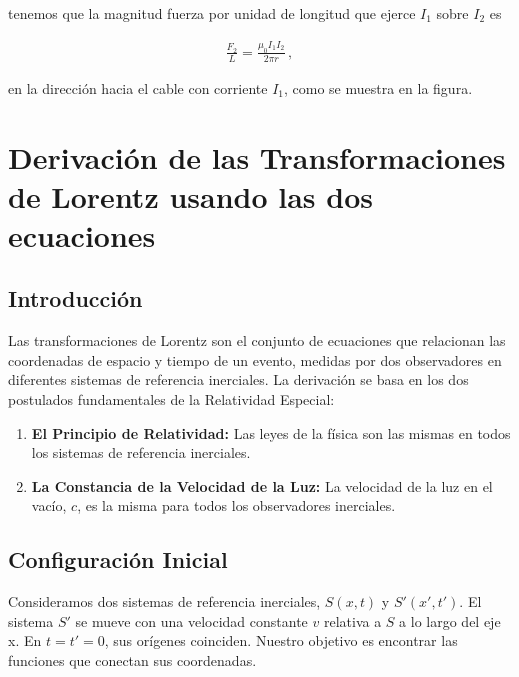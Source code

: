 \documentclass[11pt,a4paper]{article}
\begin{document}
\begin{minipage}{\mipa}
tenemos que la magnitud fuerza por unidad de longitud que ejerce $I_1$ sobre $I_2$ es
\end{minipage}

\begin{align*}
    \frac{F_2}{L} = \frac{\mu_0 I_1 I_2}{2\pi r}\,,
\end{align*}

\begin{minipage}{\mipa}
en la dirección hacia el cable con corriente $I_1$, como se muestra en la figura.
\end{minipage}



\section*{Derivación de las Transformaciones de Lorentz usando las dos ecuaciones}

\subsection*{Introducción}

Las transformaciones de Lorentz son el conjunto de ecuaciones que relacionan las coordenadas de espacio y tiempo de un evento, medidas por dos observadores en diferentes sistemas de referencia inerciales. La derivación se basa en los dos postulados fundamentales de la Relatividad Especial:
\begin{enumerate}
    \item \textbf{El Principio de Relatividad:} Las leyes de la física son las mismas en todos los sistemas de referencia inerciales.
    \item \textbf{La Constancia de la Velocidad de la Luz:} La velocidad de la luz en el vacío, $c$, es la misma para todos los observadores inerciales.
\end{enumerate}

\subsection*{Configuración Inicial}
Consideramos dos sistemas de referencia inerciales, $S(x,t)$ y $S'(x',t')$. El sistema $S'$ se mueve con una velocidad constante $v$ relativa a $S$ a lo largo del eje x. En $t=t'=0$, sus orígenes coinciden. Nuestro objetivo es encontrar las funciones que conectan sus coordenadas.
\end{document}
